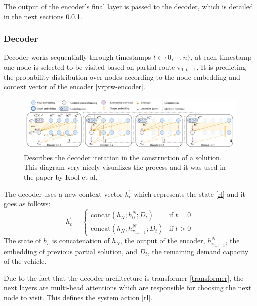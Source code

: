     The output of the encoder's final layer is passed to the decoder, which is detailed in the next sections \ref{vrptw-decoder}.
    
    \subsubsection{Decoder}\label{vrptw-decoder}
    Decoder works sequentially through timestamps $t \in \{0, \cdots, n\}$, at each timestamp one node is selected to be visited based on partial route $\pi_{1:t-1}$. It is predicting the probability distribution over nodes according to the node embedding and context vector of the encoder \ref{vrptw-encoder}.
    
    \begin{figure}[ht]
        \centering
        \includegraphics[width=1.0\textwidth]{resources/vrptw-ai/decoder-diagram.png}
        \caption{Describes the decoder iteration in the construction of a solution. This diagram very nicely visualizes the process and it was used in the paper by Kool et al. \cite{attention-route}}
        \label{fig:encoder-diagram}
    \end{figure}
    
    The decoder uses a new context vector $h_{c}^{'}$ which represents the state \ref{rl} and it goes as follows:
    \begin{equation}\label{decode-state-vec}
        h_{c}^{'} = \begin{cases} \text{concat}(h_N; h_0^N; D_t) & \mbox{if } t = 0 \\ \text{concat}(h_N; h_{\pi_{1:t-1}}^N; D_t) & \mbox{if } t > 0 \end{cases}
    \end{equation}
    The state of $h_{c}^{'}$ is concatenation of $h_N$, the output of the encoder, $h_{\pi_{1:t-1}}^N$, the embedding of previous partial solution, and $D_t$, the remaining demand capacity of the vehicle.
    
    Due to the fact that the decoder architecture is transformer \ref{transformer}, the next layers are multi-head attentions which are responsible for choosing the next node to visit. This defines the system action \ref{rl}.
    
